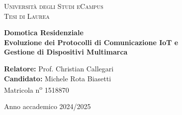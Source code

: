 \documentclass[12pt,a4paper]{report}
\begin{document}
\begin{titlepage}
    \begin{center}
        \textsc{\LARGE Universit\`a degli Studi eCampus} \\
        \vspace{0.5cm}
        \textsc{\Large Tesi di Laurea} \\
        \vspace{1.5cm}

        {\Huge \textbf{Domotica Residenziale}} \\
        \vspace{0.5cm}
        {\Large \textbf{Evoluzione dei Protocolli di Comunicazione IoT e}} \\
        \vspace{0.2cm}
        {\Large \textbf{Gestione di Dispositivi Multimarca}} \\

        \vfill
        \begin{flushleft}
            \textbf{Relatore:} Prof. Christian Callegari \\
            \textbf{Candidato:} Michele Rota Biasetti \\
            Matricola n\textsuperscript{o} 1518870
        \end{flushleft}

        \vfill
        Anno accademico 2024/2025
    \end{center}
\end{titlepage}

\tableofcontents
\newpage









\appendix


\printbibliography
\end{document}
